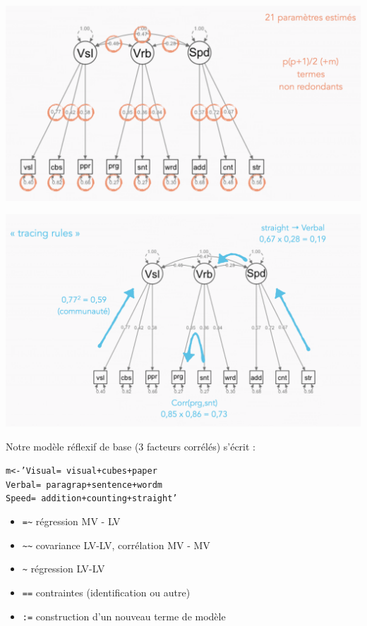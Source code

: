 
{\centering \includegraphics[width=.85\textwidth]{figs/cfa3.eps}\par}


{\centering \includegraphics[width=.85\textwidth]{figs/cfa2.eps}\par}


Notre modèle réflexif de base (3 facteurs corrélés) s'écrit :
\begin{alltt}
m <- 'Visual =~ visual + cubes + paper 
      Verbal =~ paragrap + sentence + wordm
      Speed  =~ addition + counting + straight'
\end{alltt}

\begin{itemize}
\item \verb|=~| régression MV - LV 
\item \verb|~~| covariance LV-LV, corrélation MV - MV 
\item \verb|~| régression LV-LV 
\item \texttt{==} contraintes (identification ou autre) 
\item \texttt{:=} construction d’un nouveau terme de modèle
\end{itemize}


